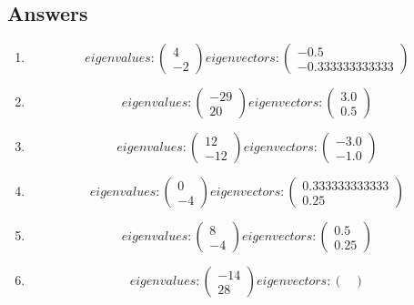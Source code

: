 \documentclass{article}%
\begin{document}
\subsection{Answers}%
\begin{enumerate}[label=\arabic*)]%
\item%
\[%
eigenvalues: \begin{pmatrix}%
4\\%
-2%
\end{pmatrix} eigenvectors: \begin{pmatrix}%
-0.5\\%
-0.333333333333%
\end{pmatrix}%
\]%
\item%
\[%
eigenvalues: \begin{pmatrix}%
-29\\%
20%
\end{pmatrix} eigenvectors: \begin{pmatrix}%
3.0\\%
0.5%
\end{pmatrix}%
\]%
\item%
\[%
eigenvalues: \begin{pmatrix}%
12\\%
-12%
\end{pmatrix} eigenvectors: \begin{pmatrix}%
-3.0\\%
-1.0%
\end{pmatrix}%
\]%
\item%
\[%
eigenvalues: \begin{pmatrix}%
0\\%
-4%
\end{pmatrix} eigenvectors: \begin{pmatrix}%
0.333333333333\\%
0.25%
\end{pmatrix}%
\]%
\item%
\[%
eigenvalues: \begin{pmatrix}%
8\\%
-4%
\end{pmatrix} eigenvectors: \begin{pmatrix}%
0.5\\%
0.25%
\end{pmatrix}%
\]%
\item%
\[%
eigenvalues: \begin{pmatrix}%
-14\\%
28%
\end{pmatrix} eigenvectors: \begin{pmatrix}%

\end{pmatrix}\]
\end{enumerate}
\end{document}
